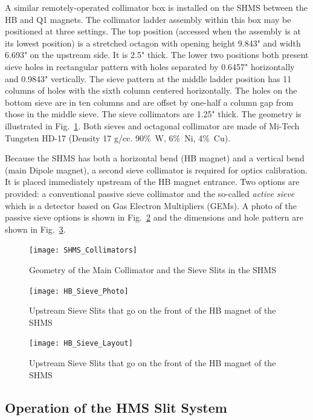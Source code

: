 {A similar remotely-operated collimator box is installed on the SHMS between the
HB and Q1 magnets. The collimator ladder assembly within this box may be positioned
at three settings. The top position (accessed when the assembly is at its lowest
position) is a stretched octagon with opening height 9.843" and width 6.693" on the
upstream side. It is 2.5" thick. The lower two positions both present sieve holes in
rectangular pattern with holes separated by 0.6457" horizontally and 0.9843"
vertically. The sieve pattern at the middle ladder position has 11 columns of holes with
the sixth column centered horizontally. The holes on the bottom sieve are in ten
columns and are offset by one-half a column gap from those in the middle sieve.
The sieve collimators are 1.25" thick. The geometry is illustrated in Fig.~\ref{fig:SHMS_Collimators}.
Both sieves and octagonal collimator are
made of Mi-Tech\texttrademark{} Tungsten HD-17 (Density 17 g/cc. 90\%~W, 6\%~Ni, 4\%~Cu).

Because the SHMS has both a horizontal bend (HB magnet) and a vertical bend (main Dipole
magnet), a second sieve collimator is required for optics calibration. It is placed immediately
upstream of the HB magnet entrance. Two options are provided: a conventional passive
sieve collimator and the so-called \textit{active sieve} which is a detector based on Gas Electron 
Multipliers (GEMs).  A photo of the passive sieve options is shown in Fig.~\ref{fig:HB_Sieve_Photo}
and the dimensions and hole pattern are shown in Fig.~\ref{fig:HB_Sieve_Layout}.

\begin{figure}
\texttt{[image: SHMS\_Collimators]}
\caption{Geometry of the Main Collimator and the Sieve Slits in the SHMS \label{fig:SHMS_Collimators}}
\end{figure}

\begin{figure}
\texttt{[image: HB\_Sieve\_Photo]}
\caption{Upstream Sieve Slits that go on the front of the HB magnet of the SHMS \label{fig:HB_Sieve_Photo}}
\end{figure}

\begin{figure}
\texttt{[image: HB\_Sieve\_Layout]}
\caption{Upstream Sieve Slits that go on the front of the HB magnet of the SHMS \label{fig:HB_Sieve_Layout}}
\end{figure}

\subsection{Operation of the HMS Slit System}\label{sssec:slit_control}

}
